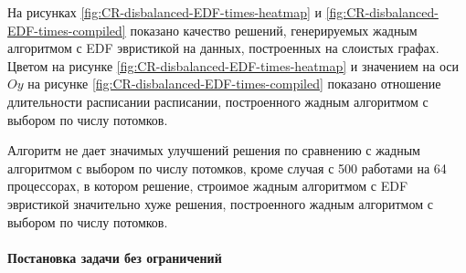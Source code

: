 На рисунках \ref{fig:CR-disbalanced-EDF-times-heatmap} и \ref{fig:CR-disbalanced-EDF-times-compiled} показано качество решений, генерируемых жадным алгоритмом с EDF эвристикой на данных, построенных на слоистых графах. Цветом на рисунке \ref{fig:CR-disbalanced-EDF-times-heatmap} и значением на оси $Oy$ на рисунке \ref{fig:CR-disbalanced-EDF-times-compiled} показано отношение длительности расписании расписании, построенного жадным алгоритмом с выбором по числу потомков.

Алгоритм не дает значимых улучшений решения по сравнению с жадным алгоритмом с выбором по числу потомков, кроме случая с 500 работами на 64 процессорах, в котором решение, строимое жадным алгоритмом с EDF эвристикой значительно хуже решения, построенного жадным алгоритмом с выбором по числу потомков.


\paragraph{Постановка задачи без ограничений}

